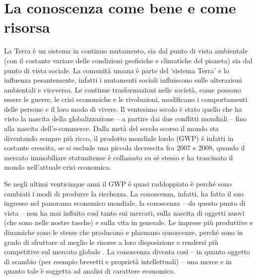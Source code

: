 \chapter{La conoscenza come bene e come risorsa}

La Terra è un sistema in continuo mutamento, sia dal punto di vista ambientale (con il
costante variare delle condizioni geofisiche e climatiche del pianeta) sia dal punto di vista
sociale. La comunità umana è parte del ‘sistema Terra’ e lo influenza pesantemente, infatti i
mutamenti sociali influiscono sulle alterazioni ambientali e viceversa. Le continue
trasformazioni nelle società, come possono essere le guerre, le crisi economiche e le
rivoluzioni, modificano i comportamenti delle persone e il loro modo di vivere. Il ventesimo
secolo è stato quello che ha visto la nascita della globalizzazione – a partire dai due conflitti
mondiali – fino alla nascita dell'e-commerce. Dalla metà del secolo scorso il mondo sta
diventando sempre più ricco, il prodotto mondiale lordo (GWP) è infatti in costante crescita,
se si esclude una piccola decrescita fra 2007 e 2008, quando il mercato immobiliare
statunitense è collassato su sé stesso e ha trascinato il mondo nell'attuale crisi economica.

Se negli ultimi venticinque anni il GWP è quasi raddoppiato è perché sono cambiati i
modi di produrre la ricchezza. La conoscenza, infatti, ha fatto il suo ingresso nel panorama
economico mondiale, la conoscenza – da questo punto di vista – non ha mai influito così
tanto sui mercati, sulla nascita di oggetti nuovi (che sono nelle nostre tasche) e sulla vita in
generale. Le imprese più produttive e dinamiche sono le stesse che producono e plasmano
conoscenze, perché sono in grado di sfruttare al meglio le risorse a loro disposizione e
rendersi più competitive sul mercato globale \parencite{greco}. La conoscenza
diventa così – in quanto oggetto di scambio (per esempio brevetti e proprietà intellettuali) –
una merce e in quanto tale è soggetta ad analisi di carattere economico.

